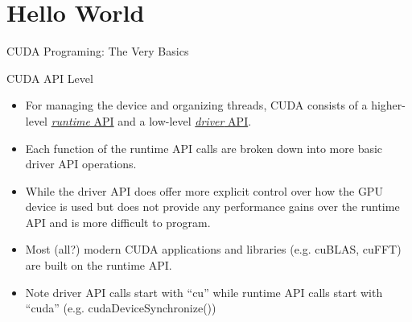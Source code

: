 \documentclass[handout]{beamer}
\begin{document}
\section{Hello World}
\begin{frame}[fragile]{CUDA Programing: The Very Basics}

\end{frame}

\begin{frame}{CUDA API Level}
\begin{itemize}
\itemsep1em
	\item<1->For managing the device and organizing threads, CUDA consists of a higher-level \href{http://docs.nvidia.com/cuda/cuda-runtime-api/index.html}{\color{blue}\emph{runtime} API} and a low-level \href{http://docs.nvidia.com/cuda/cuda-driver-api/index.html}{\color{blue}\emph{driver} API}.
	\item<2->Each function of the runtime API calls are broken down into more basic driver API operations.
	\item<3->While the driver API does offer more explicit control over how the GPU device is used but does not provide any performance gains over the runtime API and is more difficult to program.
	\item<4->Most (all?) modern CUDA applications and libraries (e.g. cuBLAS, cuFFT) are built on the runtime API.
	\item<5->Note driver API calls start with ``cu'' while runtime API calls start with ``cuda'' (e.g. {\selectfont cudaDeviceSynchronize()})
\end{itemize}
\end{frame}
\end{document}
